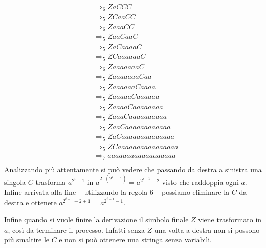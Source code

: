 \documentclass[12pt, answers]{exam}
\newcommand{\der}{\Rightarrow}
\begin{document}
\begin{questions}
\begin{solution}
\begin{align*}
			  &\der_6 Z a C C C \\
			  &\der_5 Z C a a C C \\
			  &\der_6 Z a a a C C \\
			  &\der_5 Z a a C a a C \\
			  &\der_5 Z a C a a a a C \\
			  &\der_5 Z C a a a a a a C \\
			  &\der_6 Z a a a a a a a C \\
			  &\der_5 Z a a a a a a a C a a \\
			  &\der_5 Z a a a a a a C a a a a \\
			  &\der_5 Z a a a a a C a a a a a a \\
			  &\der_5 Z a a a a C a a a a a a a a \\
			  &\der_5 Z a a a C a a a a a a a a a a \\
			  &\der_5 Z a a C a a a a a a a a a a a a \\
			  &\der_5 Z a C a a a a a a a a a a a a a a \\
			  &\der_5 Z C a a a a a a a a a a a a a a a a \\
			  &\der_7 a a a a a a a a a a a a a a a a a a \\
		\end{align*}
		Analizzando più attentamente si può vedere che passando da destra a sinistra una singola $C$ trasforma $a^{2^i - 1}$ in $a^{2 \cdot (2^i - 1)} = a^{2^{i + 1} - 2}$ visto che raddoppia ogni $a$.
		Infine arrivata alla fine -- utilizzando la regola 6 -- possiamo eliminare la $C$ da destra e ottenere $a^{2^{i + 1} - 2 + 1} = a^{2^{i + 1} - 1}$.

		Infine quando si vuole finire la derivazione il simbolo finale $Z$ viene trasformato in $a$, così da terminare il processo. 
		Infatti senza $Z$ una volta a destra non si possono più smaltire le $C$ e non si può ottenere una stringa senza variabili.

	\end{solution}


\end{questions}
\end{document}

